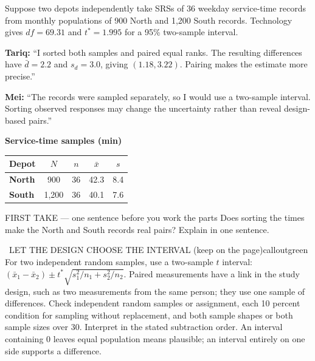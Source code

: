 \documentclass[11pt]{article}
\begin{document}
\clearpage
{}

Suppose two depots independently take SRSs of 36 weekday service-time records from monthly populations of 900 North and 1,200 South records. Technology gives $df=69.31$ and $t^*=1.995$ for a 95\% two-sample interval.\par\smallskip \textbf{Tariq:} ``I sorted both samples and paired equal ranks. The resulting differences have $\bar d=2.2$ and $s_d=3.0$, giving $(1.18,3.22)$. Pairing makes the estimate more precise.''\par \textbf{Mei:} ``The records were sampled separately, so I would use a two-sample interval. Sorting observed responses may change the uncertainty rather than reveal design-based pairs.''\par
\begin{center}
\textbf{Service-time samples (min)}\par\smallskip
\begin{tabular}{|l|c|c|c|c|}
\hline
\textbf{Depot} & \textbf{$N$} & \textbf{$n$} & \textbf{$\bar x$} & \textbf{$s$} \\ \hline
\textbf{North} & 900 & 36 & 42.3 & 8.4 \\ \hline
\textbf{South} & 1,200 & 36 & 40.1 & 7.6 \\ \hline
\end{tabular}
\end{center}
\begin{firsttakebox}{FIRST TAKE --- one sentence before you work the parts}
Does sorting the times make the North and South records real pairs? Explain in one sentence.\par
{}
\end{firsttakebox}

\begin{callout}{\IconBook\ LET THE DESIGN CHOOSE THE INTERVAL (keep on the page)}{calloutgreen}
For two independent random samples, use a two-sample $t$ interval:
$(\bar x_1-\bar x_2)\pm t^*\sqrt{s_1^2/n_1+s_2^2/n_2}$. Paired measurements have a link
in the study design, such as two measurements from the same person; they use one sample of differences.
Check independent random samples or assignment, each 10 percent condition for sampling without replacement,
and both sample shapes or both sample sizes over 30. Interpret in the stated subtraction order.
An interval containing 0 leaves equal population means plausible; an interval entirely on one side supports a difference.
\end{callout}
\end{document}
